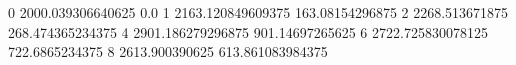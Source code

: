 0 2000.039306640625 0.0
1 2163.120849609375 163.08154296875
2 2268.513671875 268.474365234375
4 2901.186279296875 901.14697265625
6 2722.725830078125 722.6865234375
8 2613.900390625 613.861083984375
